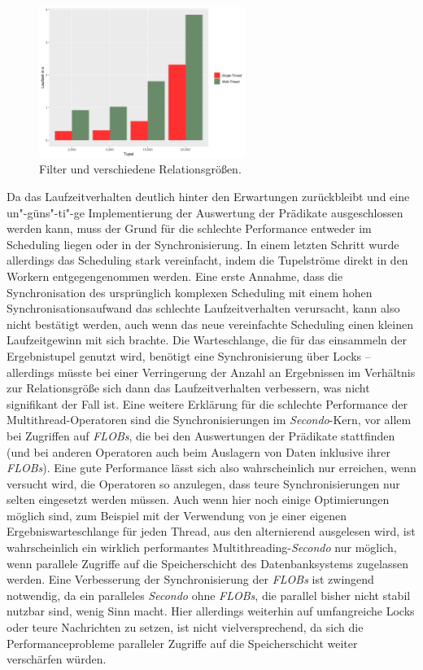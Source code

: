 \documentclass[a4paper,12pt,twoside]{article}
\newcommand{\Fb}[1]{\textit{#1}} %
\begin{document}
\begin{figure}
	\centering
	\includegraphics[width=0.60\textwidth]{Bilder/filter_head.png}
	\caption{Filter und verschiedene Relationsgrößen.}
	\label{img:filterHead}
\end{figure}

Da das Laufzeitverhalten deutlich hinter den Erwartungen zurückbleibt und eine un"-güns"-ti"-ge Implementierung der Auswertung der Prädikate ausgeschlossen werden kann, muss der Grund für die schlechte Performance entweder im Scheduling liegen oder in der Synchronisierung. In einem letzten Schritt wurde allerdings das Scheduling stark vereinfacht, indem die Tupelströme direkt in den Workern entgegengenommen werden. Eine erste Annahme, dass die Synchronisation des ursprünglich komplexen Scheduling mit einem hohen Synchronisationsaufwand das schlechte Laufzeitverhalten verursacht, kann also nicht bestätigt werden, auch wenn das neue vereinfachte Scheduling einen kleinen Laufzeitgewinn mit sich brachte. Die Warteschlange, die für das einsammeln der Ergebnistupel genutzt wird, benötigt eine Synchronisierung über Locks -- allerdings müsste bei einer Verringerung der Anzahl an Ergebnissen im Verhältnis zur Relationsgröße sich dann das Laufzeitverhalten verbessern, was nicht signifikant der Fall ist. Eine weitere Erklärung für die schlechte Performance der Multithread-Operatoren sind die Synchronisierungen im \Fb{Secondo}-Kern, vor allem bei Zugriffen auf \Fb{FLOBs}, die bei den Auswertungen der Prädikate stattfinden (und bei anderen Operatoren auch beim Auslagern von Daten inklusive ihrer \Fb{FLOBs}). Eine gute Performance lässt sich also wahrscheinlich nur erreichen, wenn versucht wird, die Operatoren so anzulegen, dass teure Synchronisierungen nur selten eingesetzt werden müssen. Auch wenn hier noch einige Optimierungen möglich sind, zum Beispiel mit der Verwendung von je einer eigenen Ergebniswarteschlange für jeden Thread, aus den alternierend ausgelesen wird, ist wahrscheinlich ein wirklich performantes Multithreading-\Fb{Secondo} nur möglich, wenn parallele Zugriffe auf die Speicherschicht des Datenbanksystems zugelassen werden. Eine Verbesserung der Synchronisierung der \Fb{FLOBs} ist zwingend notwendig, da ein paralleles \Fb{Secondo} ohne \Fb{FLOBs}, die parallel bisher nicht stabil nutzbar sind, wenig Sinn macht. Hier allerdings weiterhin auf umfangreiche Locks oder teure Nachrichten zu setzen, ist nicht vielversprechend, da sich die Performanceprobleme paralleler Zugriffe auf die Speicherschicht weiter verschärfen würden. 
\end{document}
